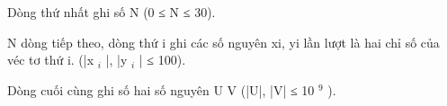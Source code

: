 Dòng thứ nhất ghi số N (0 ≤ N ≤ 30).  

   N dòng tiếp theo, dòng thứ i ghi các số nguyên xi, yi lần lượt là hai chỉ số của véc tơ thứ i. (|x   $_    i   $   |, |y   $_    i   $   | ≤ 100).  

   Dòng cuối cùng ghi số hai số nguyên U V (|U|, |V| ≤ 10   $^    9   $   ).
